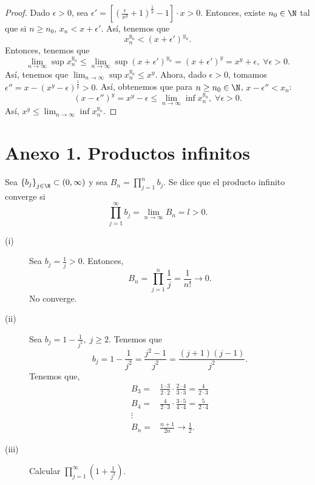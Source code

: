 \begin{proof}
	Dado $\displaystyle \epsilon > 0 $, sea $\displaystyle \epsilon ' = \left[\left(\frac{\epsilon }{x^{y}}+1\right)^{\frac{1}{y}}-1\right] \cdot x > 0 $. Entonces, existe $\displaystyle n_{0} \in \N $ tal que si $\displaystyle n \geq n_{0} $, $\displaystyle x_{n} < x + \epsilon ' $. Así, tenemos que 
\[x_{n}^{y_{n}} < \left(x + \epsilon'\right)^{y_{n}} .\]
Entonces, tenemos que 
\[\lim_{n \to \infty}\sup x_{n}^{y_{n}} \leq \lim_{n \to \infty}\sup\left(x+\epsilon'\right)^{y_{n}}=\left(x+\epsilon'\right)^{y} = x^{y}+\epsilon, \; \forall \epsilon > 0.\]
Así, tenemos que $\displaystyle \lim_{n \to \infty}\sup x_{n}^{y_{n}} \leq x^{y} $. Ahora, dado $\displaystyle \epsilon > 0 $, tomamos $\displaystyle \epsilon '' = x - \left(x^{y}-\epsilon \right)^{\frac{1}{y}} > 0 $. Así, obtenemos que para $\displaystyle n \geq n_{0}\in\N $, $\displaystyle x-\epsilon '' < x_{n} $:
\[\left(x - \epsilon ''\right)^{y} = x^{y}-\epsilon \leq \lim_{n \to \infty}\inf x_{n}^{y_{n}}, \; \forall \epsilon > 0 .\]
Así, $\displaystyle x^{y} \leq \lim_{n \to \infty}\inf x_{n}^{y_{n}} $.
\end{proof}

\section{Anexo 1. Productos infinitos}

Sea $\displaystyle \left\{ b_{j}\right\} _{j\in\N}\subset\left(0, \infty\right) $ y sea $\displaystyle B_{n} = \prod^{n}_{j=1}b_{j} $. Se dice que el producto infinito converge si 
\[\prod^{\infty}_{j=1}b_{j} = \lim_{n \to \infty}B_{n} = l > 0 .\]

\begin{eg}
\normalfont 
\begin{description}
\item[(i)] Sea $\displaystyle b_{j} = \frac{1}{j} > 0 $. Entonces, 
\[B_{n} = \prod^{n}_{j=1}\frac{1}{j} = \frac{1}{n!} \to 0 .\]
No converge. 
\item[(ii)] Sea $\displaystyle b_{j}= 1 - \frac{1}{j^{2}}, \; j \geq 2 $. Tenemos que 
	\[b_{j} = 1 - \frac{1}{j^{2}} = \frac{j^{2}-1}{j^{2}} = \frac{\left(j+1\right)\left(j-1\right)}{j^{2}} .\]
Tenemos que, 
\[
\begin{split}
	B_{3} = & \frac{1 \cdot 3}{2 \cdot 2} \cdot \frac{2 \cdot 4}{3 \cdot 3} = \frac{4}{2 \cdot 3} \\
	B_{4} = & \frac{4}{2 \cdot 3} \cdot \frac{3 \cdot 5}{4 \cdot 4} = \frac{5}{2 \cdot 4} \\
	\vdots & \\
	B_{n} = & \frac{n+1}{2n} \to \frac{1}{2}.
\end{split}
\]
\item[(iii)] Calcular $\displaystyle \prod^{\infty}_{j=1}\left(1 +\frac{1}{j^{2}}\right) $.
\end{description}
\end{eg}

